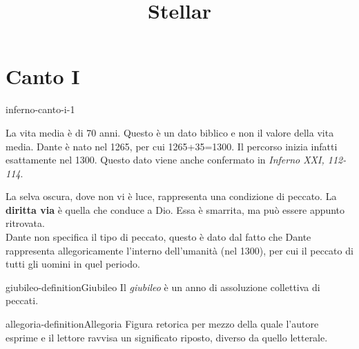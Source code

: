 \documentclass[preview]{standalone}
\begin{document}
\title{Stellar}
\genpage

\section{Canto I}


\begin{snippet}{inferno-canto-i-1}

    La vita media è di 70 anni. Questo è un dato biblico e non il valore della vita media.
    Dante è nato nel 1265, per cui 1265+35=1300. Il percorso inizia infatti esattamente nel 1300.
    Questo dato viene anche confermato in \textit{Inferno XXI, 112-114}.

    La selva oscura, dove non vi è luce, rappresenta una condizione di peccato.
    La \textbf{diritta via} è quella che conduce a Dio.
    Essa è smarrita, ma può essere appunto ritrovata.
    \\
    Dante non specifica il tipo di peccato, questo è dato dal fatto che Dante rappresenta allegoricamente
    l'interno dell'umanità (nel 1300), per cui il peccato di tutti gli uomini in quel periodo.
\end{snippet}

\begin{snippetdefinition}{giubileo-definition}{Giubileo}
    Il \textit{giubileo} è un anno di assoluzione collettiva di peccati.
\end{snippetdefinition}


\begin{snippetdefinition}{allegoria-definition}{Allegoria}
    Figura retorica per mezzo della quale l'autore esprime e il lettore ravvisa un significato riposto,
    diverso da quello letterale.
\end{snippetdefinition}
\end{document}
